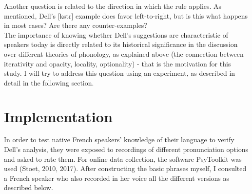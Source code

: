 \documentclass{article}
\begin{document}
Another question is related to the direction in which the rule applies. As mentioned,  Dell's [kstr] example does favor left-to-right, but is this what happens in most cases? Are there any counter-examples?\\

The importance of knowing whether Dell's suggestions are characteristic of speakers today is directly related to its historical significance in the discussion over different theories of phonology,  as explained above (the connection between iterativity and opacity, locality, optionality) - that is the motivation for this study. I will try to address this question using an experiment, as described in detail in the following section.


\clearpage
\section{Implementation} %
In order to test native French speakers' knowledge of their language to verify Dell's analysis, they were exposed to recordings of different pronunciation options and asked to rate them.  For online data collection,  the software PsyToolkit was used (Stoet, 2010, 2017). After constructing the basic phrases myself, I consulted a French speaker who also recorded in her voice all the different versions as described below. 


\end{document}
